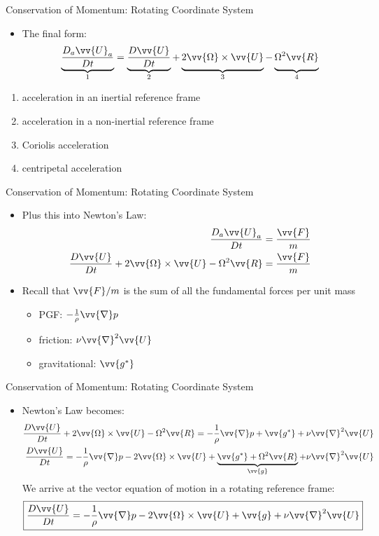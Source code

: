 \begin{frame}{Conservation of Momentum: Rotating Coordinate System}
\begin{itemize}
	\item The final form:
	$$\underbrace{\frac{D_a \vv{U}_a}{Dt}}_{1} = \underbrace{\frac{D\vv{U}}{Dt}}_{2} + \underbrace{\vphantom{\frac{D\vv{U}}{Dt}}2\vv{\Omega}\times \vv{U}}_{3} - \underbrace{\vphantom{\frac{D\vv{U}}{Dt}}\Omega^2 \vv{R}}_{4}$$
\end{itemize}
\begin{enumerate}
	\item acceleration in an inertial reference frame
	\item acceleration in a non-inertial reference frame
	\item Coriolis acceleration
	\item centripetal acceleration
\end{enumerate}
\end{frame}
\begin{frame}{Conservation of Momentum: Rotating Coordinate System}
\begin{itemize}
	\item Plus this into Newton's  Law:
	\begin{align*}
	\frac{D_a\vv{U}_a}{Dt} &= \frac{\vv{F}}{m}\\	
	\frac{D\vv{U}}{Dt} + 2\vv{\Omega}\times \vv{U} -\Omega^2 \vv{R} &= \frac{\vv{F}}{m}
	\end{align*}
	\item Recall that $\vv{F}/m$ is the sum of all the fundamental forces per unit mass
	\begin{itemize}
		\item PGF: $-\frac{1}{\rho}\vv{\nabla}p$
		\item friction: $\nu \vv{\nabla}^2 \vv{U}$
		\item gravitational: $\vv{g^*}$
	\end{itemize}
\end{itemize}
\end{frame}
\begin{frame}{Conservation of Momentum: Rotating Coordinate System}
\begin{itemize}
	\item Newton's  Law becomes:
	\begin{align*}
	\frac{D\vv{U}}{Dt} + 2\vv{\Omega}\times \vv{U} -\Omega^2 \vv{R} = -\frac{1}{\rho}\vv{\nabla}p + \vv{g^*} + \nu \vv{\nabla}^2 \vv{U}\\
	\frac{D\vv{U}}{Dt} = -\frac{1}{\rho}\vv{\nabla}p - 2\vv{\Omega}\times \vv{U} + \underbrace{\vv{g^*} + \Omega^2 \vv{R}}_{\vv{g}}+ \nu \vv{\nabla}^2 \vv{U}
	\end{align*}
	We arrive at the vector equation of motion in a rotating reference frame:
	$$\boxed{\frac{D\vv{U}}{Dt} = -\frac{1}{\rho}\vv{\nabla}p - 2\vv{\Omega}\times \vv{U} + \vv{g} + \nu \vv{\nabla}^2\vv{U}}$$
\end{itemize}
\end{frame}
